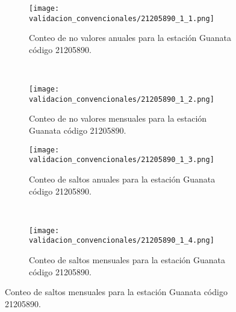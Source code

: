 \begin{figure}[H]\ContinuedFloat
\centering
	\begin{subfigure}[normla]{0.4\textwidth}
	\texttt{[image: validacion\_convencionales/21205890\_1\_1.png]}
		\caption{Conteo de no valores anuales para la estación Guanata código 21205890.}
		\label{subfig:a1}
		\end{subfigure}
		~
    \begin{subfigure}[normla]{0.4\textwidth}
	\texttt{[image: validacion\_convencionales/21205890\_1\_2.png]}
		\caption{Conteo de no valores mensuales para la estación Guanata código 21205890.}
		\label{subfig:a2}
		\end{subfigure}
		
    \begin{subfigure}[normla]{0.4\textwidth}
	\texttt{[image: validacion\_convencionales/21205890\_1\_3.png]}
		\caption{Conteo de saltos anuales para la estación Guanata código 21205890.}
		\label{subfig:a1}
		\end{subfigure}
		~
    \begin{subfigure}[normla]{0.4\textwidth}
	\texttt{[image: validacion\_convencionales/21205890\_1\_4.png]}
		\caption{Conteo de saltos mensuales para la estación Guanata código 21205890.}
		\label{subfig:a2}
		\end{subfigure}

	
\end{figure}
           
\begin{figure}[H]\ContinuedFloat
\centering
\end{figure}
           
\begin{figure}[H]\ContinuedFloat
\centering
\end{figure}
           
